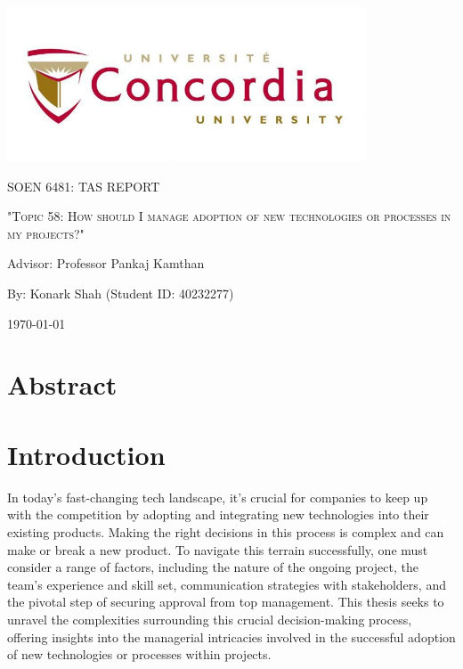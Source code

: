 \documentclass{article}
\begin{document}
\begin{titlepage}
    \centering
    \includegraphics[width=0.8\textwidth]{image.jpeg}\par %
     \vspace{2cm}
    {\scshape\Large SOEN 6481: TAS REPORT \par}
    \vspace{1.5cm}
    {\scshape\Huge "Topic 58: How should I manage adoption of new technologies or processes in my projects?"\par}
    \vspace{1.5cm}
    {\large Advisor: Professor Pankaj Kamthan\par}
    \vspace{1.5cm}
    {\large By: Konark Shah (Student ID: 40232277)\par}
    \vspace{1cm}
    {\large \today\par}
\end{titlepage}

\tableofcontents

\newpage

\section{Abstract}
\lipsum[1]

\section{Introduction}
In today's fast-changing tech landscape, it's crucial for companies to keep up with the competition by adopting and integrating new technologies into their existing products. Making the right decisions in this process is complex and can make or break a new product. To navigate this terrain successfully, one must consider a range of factors, including the nature of the ongoing project, the team's experience and skill set, communication strategies with stakeholders, and the pivotal step of securing approval from top management. This thesis seeks to unravel the complexities surrounding this crucial decision-making process, offering insights into the managerial intricacies involved in the successful adoption of new technologies or processes within projects.
\end{document}
